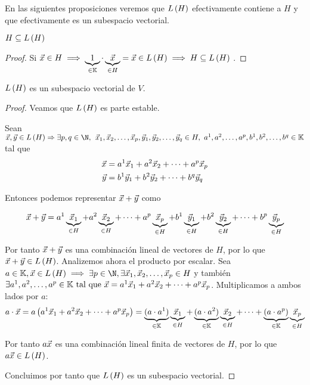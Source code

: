 \documentclass[../algebra_lineal.tex]{subfiles}
\begin{document}
En las siguientes proposiciones veremos que $L\left(H\right)$ efectivamente contiene a $H$ y que efectivamente es un subespacio vectorial.

\begin{proposition}
    $H \subseteq L\left(H\right)$
\end{proposition}

\begin{proof}
    Si $\vec{x} \in H \implies \underbrace{1}_{\in \mathbb{K}} \cdot \underbrace{\vec{x}}_{\in H} = \vec{x} \in L\left(H\right) \implies H \subseteq L\left(H\right)$
    $ $.
\end{proof}

\begin{proposition}
    $L\left(H\right)$ es un subespacio vectorial de $V$.
\end{proposition}

\begin{proof}
    Veamos que $L\left(H\right)$ es parte estable.

    Sean $\vx, \vy \in \lspan{H} \Rightarrow \exists p, q \in \N, \spc \dlst{\vx}{p}, \dlst{\vy}{q} \in H, \, \, \ulst{a}{p}, \ulst{b}{q} \in \K $
    tal que 
    \begin{align*}
        \vec{x} &= {a}^{1}\vec{x}_{1}+{a}^{2}\vec{x}_{2}+\dots+{a}^{p}\vec{x}_{p} \\
        \vec{y} &= {b}^{1}\vec{y}_{1}+{b}^{2}\vec{y}_{2}+\dots+{b}^{q}\vec{y}_{q}
    \end{align*}

    Entonces podemos representar $\vec{x} + \vec{y}$ como
    
    \[
        \vec{x} + \vec{y} = a^1\underbrace{\vec{x}_1}_{\in H}+a^2\underbrace{\vec{x}_2}_{\in H}+\dots+a^p\underbrace{\vec{x}_p}_{\in H} + b^1\underbrace{\vec{y}_1}_{\in H}+b^2\underbrace{\vec{y}_2}_{\in H}+\dots+b^p\underbrace{\vec{y}_p}_{\in H}
    \]

    Por tanto $\vec{x} + \vec{y}$ es una combinación lineal de vectores de $H$, por lo que $\vec{x} + \vec{y} \in L\left(H\right)$. Analizemos ahora el producto por escalar. Sea $a \in \K, \vx \in \lspan{H} \implies \exists p \in \N, \space \exists \dlst{\vx}{p} \in H$ y también $\exists {a}^{1}, {a}^{2}, \dots, {a}^{p} \in \mathbb{K} \mathrm{\,\, tal \,\, que \,\,} \vec{x} = {a}^{1}\vec{x}_{1}+{a}^{2}\vec{x}_{2}+\dots+{a}^{p}\vec{x}_{p}$.  Multiplicamos a ambos lados por $a$:
    \[a\cdot \vec{x} = a \left( {a}^{1}\vec{x}_{1}+{a}^{2}\vec{x}_{2}+\dots+{a}^{p}\vec{x}_{p} \right) = \underbrace{(a \cdot a^1)}_{\in \mathbb{K}}\underbrace{\vec{x}_1}_{\in H} + \underbrace{(a \cdot a^2)}_{\in \mathbb{K}}\underbrace{\vec{x}_2}_{\in H} + \dots + \underbrace{(a \cdot a^p)}_{\in \mathbb{K}}\underbrace{\vec{x}_p}_{\in H}\]

    Por tanto $a\vec{x}$ es una combinación lineal finita de vectores de $H$, por lo que $a\vec{x} \in L\left(H\right)$.

    Concluimos por tanto que $L\left(H\right)$ es un subespacio vectorial.
\end{proof}
\end{document}
